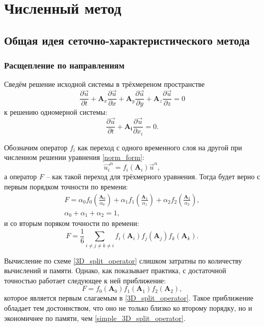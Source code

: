\section{Численный метод}
\subsection{Общая идея сеточно-характеристического метода}
\subsubsection{Расщепление по направлениям}

Сведём решение исходной системы в трёхмереном пространстве
\begin{equation}
	\label{matrix_anisotropy_equation1}
	\frac{\partial\vec{u}}{\partial{t}}+\mathbf{A}_x\frac{\partial\vec{u}}{\partial{x}}+
	\mathbf{A}_y\frac{\partial\vec{u}}{\partial{y}}+
	\mathbf{A}_z\frac{\partial\vec{u}}{\partial{z}}=0
\end{equation}
к решению одномерной системы:
\begin{equation}
	\label{norm_form}
	\frac{\partial\vec{u}}{\partial{t}}+\mathbf{A_i}\frac{\partial\vec{u}}{\partial{x_i}} = 0.
\end{equation}

Обозначим оператор $f_i$ как переход с одного временного слоя на другой при численном решении уравнения \eqref{norm_form}:
\begin{equation}
	\label{simple_splitting}
	\vec{u_i}^{n} = f_i(\mathbf{A}_i)\vec{u}^{n},
\end{equation}
а оператор $F$ -- как такой переход для трёхмерного уравнения. Тогда \cite{chelnokov} будет верно с первым порядком точности по времени:
\begin{eqnarray}
\label{simple_3D_split_operator}
F = \alpha_0 f_0(\frac{\mathbf{A}_0}{\alpha_0}) + \alpha_1 f_1(\frac{\mathbf{A}_1}{\alpha_1}) + \alpha_2 f_2(\frac{\mathbf{A}_2}{\alpha_2}), \\
\alpha_0 + \alpha_1 + \alpha_2 = 1,
\end{eqnarray}
и со вторым поряком точности по времени:
\begin{equation}
\label{3D_split_operator}
F = \frac{1}{6}\sum_{i \neq j \neq k \neq i} f_i(\mathbf{A}_i)f_j(\mathbf{A}_j)f_k(\mathbf{A}_k).
\end{equation}

Вычисление по схеме \eqref{3D_split_operator} слишком затратны по количеству вычислений и памяти. Однако, как показывает практика, с достаточной точностью работает следующее к ней приближение:
\begin{equation}
\label{short_3D_split_operator}
F = f_0(\mathbf{A}_0)f_1(\mathbf{A}_1)f_2(\mathbf{A}_2),
\end{equation}
которое является первым слагаемым в \eqref{3D_split_operator}. Такое приближение обладает тем достоинством, что оно не только близко ко второму порядку, но и экономичнее по памяти, чем \eqref{simple_3D_split_operator}.

